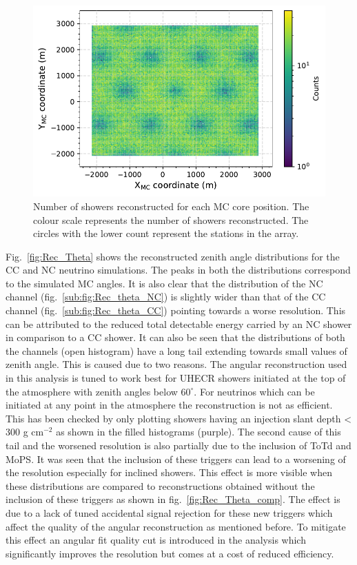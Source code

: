 \begin{figure}[h!]
  \centering
  \includegraphics[width=14.5cm]{thesis_figures/Nu_analysis/MC_control/Core_position_Profile_MC_wnt_redcut.pdf}
  \caption{Number of showers reconstructed for each MC core position. The colour scale represents the number of showers reconstructed. The circles with the lower count represent the stations in the array.}
  \label{fig:Core_XY_rec}
\end{figure}
Fig.~\ref{fig:Rec_Theta} shows the reconstructed zenith angle distributions for the CC and NC neutrino simulations. The peaks in both the distributions correspond to the simulated MC angles. It is also clear that the distribution of the NC channel (fig.~\ref{sub:fig:Rec_theta_NC}) is slightly wider than that of the CC channel (fig.~\ref{sub:fig:Rec_theta_CC}) pointing towards a worse resolution. This can be attributed to the reduced total detectable energy carried by an NC shower in comparison to a CC shower. It can also be seen that the distributions of both the channels (open histogram) have a long tail extending towards small values of zenith angle. This is caused due to two reasons. The angular reconstruction used in this analysis is tuned to work best for UHECR showers initiated at the top of the atmosphere with zenith angles below $60^{\circ}$. For neutrinos which can be initiated at any point in the atmosphere the reconstruction is not as efficient. This has been checked by only plotting showers having an injection slant depth < 300 g cm$^{-2}$ as shown in the filled histograms (purple). The second cause of this tail and the worsened resolution is also partially due to the inclusion of ToTd and MoPS. It was seen that the inclusion of these triggers can lead to a worsening of the resolution especially for inclined showers. This effect is more visible when these distributions are compared to reconstructions obtained without the inclusion of these triggers as shown in fig.~\ref{fig:Rec_Theta_comp}. The effect is due to a lack of tuned accidental signal rejection for these new triggers which affect the quality of the angular reconstruction as mentioned before. To mitigate this effect an angular fit quality cut is introduced in the analysis which significantly improves the resolution but comes at a cost of reduced efficiency.

